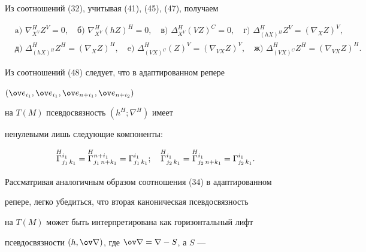 Из соотношений (32), учитывая (41), (45), (47), получаем


\begin{equation}


\begin{split}


&\text{a) } \nabla^H_{X^V}Z^V=0,\quad \text{б) }


\nabla^H_{X^V}(hZ)^H=0,\quad \text{в) }


\Delta^H_{X^V}(VZ)^C=0,\quad \text{г) }


\Delta^H_{(hX)^H}Z^V=(\nabla_X Z)^V,\\


&\text{д) } \Delta^H_{(hX)^H}Z^H=(\nabla_X Z)^H,\quad


\text{e) } \Delta^H_{(VX)^C}(Z)^V=(\nabla_{VX}Z)^V,\quad


\text{ж) } \Delta^H_{(VX)^C}Z^H=(\nabla_{VX}Z)^H.


\end{split}


\end{equation}


Из соотношений (48) следует, что в адаптированном репере


$(\ov e_{i_1},\ov e_{i_1},\ov e_{n+i_1},\ov e_{n+i_2})$


на $T(M)$ псевдосвязность $(h^H;\nabla^H)$ имеет


ненулевыми лишь следующие компоненты:


\begin{equation}


\updown{H}{}{\Gamma}^{i_1}_{j_1\,k_1}=


\updown{H}{}{\Gamma}^{n+i_1}_{j_1\,n+k_1}=


\Gamma^{i_1}_{j_1\,k_1};\quad


\updown{H}{}{\Gamma}^{i_1}_{j_2\,k_1}=


\updown{H}{}{\Gamma}^{i_1}_{j_2\,n+k_1}=


\Gamma^{i_1}_{j_2\,k_1}.


\end{equation}


Рассматривая аналогичным образом соотношения (34) в адаптированном


репере, легко убедиться, что вторая каноническая псевдосвязность


на $T(M)$ может быть интерпретирована как горизонтальный лифт


псевдосвязности $(h,\ov\nabla)$, где $\ov\nabla=\nabla-S$, а $S$ ---


